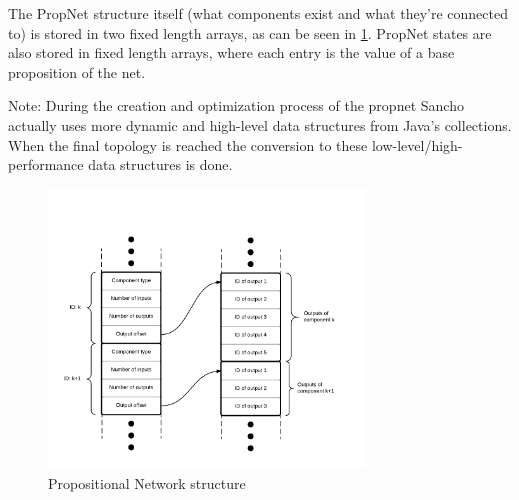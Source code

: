 The PropNet structure itself (what components exist and what they're connected to) is stored in two fixed length arrays, as can be seen in \ref{fig:propnet_structure}.
PropNet states are also stored in fixed length arrays, where each entry is the value of a base proposition of the net.

Note: During the creation and optimization process of the propnet Sancho actually uses more dynamic and high-level data structures from Java's collections. When the final topology is reached the conversion to these low-level/high-performance data structures is done.
	
\begin{figure}[h]
	\centering
	\includegraphics[width=0.75\textwidth]{images/PropNet_Structure.pdf}
	\caption{Propositional Network structure}
	\label{fig:propnet_structure}
\end{figure}

